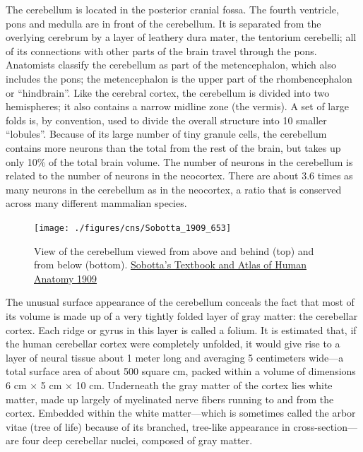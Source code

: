 The cerebellum is located in the posterior cranial fossa. The fourth ventricle, pons and medulla are in front of the cerebellum. It is separated from the overlying cerebrum by a layer of leathery dura mater, the tentorium cerebelli; all of its connections with other parts of the brain travel through the pons. Anatomists classify the cerebellum as part of the metencephalon, which also includes the pons; the metencephalon is the upper part of the rhombencephalon or ``hindbrain''. Like the cerebral cortex, the cerebellum is divided into two hemispheres; it also contains a narrow midline zone (the vermis). A set of large folds is, by convention, used to divide the overall structure into 10 smaller ``lobules''. Because of its large number of tiny granule cells, the cerebellum contains more neurons than the total from the rest of the brain, but takes up only 10\% of the total brain volume. The number of neurons in the cerebellum is related to the number of neurons in the neocortex. There are about 3.6 times as many neurons in the cerebellum as in the neocortex, a ratio that is conserved across many different mammalian species.



\begin{figure}

{\centering \texttt{[image: ./figures/cns/Sobotta\_1909\_653]} 

}

\caption{View of the cerebellum viewed from above and behind (top) and from below (bottom). \href{https://commons.wikimedia.org/wiki/File:Sobo_1909_653.png}{Sobotta's Textbook and Atlas of Human Anatomy 1909}}\label{fig:cerebellumabovebelow}
\end{figure}

The unusual surface appearance of the cerebellum conceals the fact that most of its volume is made up of a very tightly folded layer of gray matter: the cerebellar cortex. Each ridge or gyrus in this layer is called a folium. It is estimated that, if the human cerebellar cortex were completely unfolded, it would give rise to a layer of neural tissue about 1 meter long and averaging 5 centimeters wide---a total surface area of about 500 square cm, packed within a volume of dimensions 6 cm × 5 cm × 10 cm. Underneath the gray matter of the cortex lies white matter, made up largely of myelinated nerve fibers running to and from the cortex. Embedded within the white matter---which is sometimes called the arbor vitae (tree of life) because of its branched, tree-like appearance in cross-section---are four deep cerebellar nuclei, composed of gray matter.

